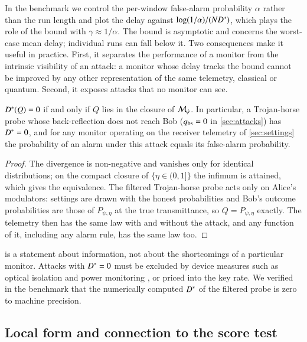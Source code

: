 In the benchmark we control the per-window false-alarm probability $\alpha$ rather than the run length and plot the delay against $\log(1/\alpha)/(ND^{\ast})$, which plays the role of the bound with $\gamma\approx1/\alpha$. The bound is asymptotic and concerns the worst-case mean delay; individual runs can fall below it. Two consequences make it useful in practice. First, it separates the performance of a monitor from the intrinsic visibility of an attack: a monitor whose delay tracks the bound cannot be improved by any other representation of the same telemetry, classical or quantum. Second, it exposes attacks that no monitor can see.

\begin{proposition}\label{prop:blind}
$D^{\ast}(Q)=0$ if and only if $Q$ lies in the closure of $\mathcal{M}_\psi$. In particular, a Trojan-horse probe whose back-reflection does not reach Bob ($q_{\rm bs}=0$ in \cref{sec:attacks}) has $D^{\ast}=0$, and for any monitor operating on the receiver telemetry of \cref{sec:settings} the probability of an alarm under this attack equals its false-alarm probability.
\end{proposition}
\begin{proof}
The divergence is non-negative and vanishes only for identical distributions; on the compact closure of $\{\eta\in(0,1]\}$ the infimum is attained, which gives the equivalence. The filtered Trojan-horse probe acts only on Alice's modulators: settings are drawn with the honest probabilities and Bob's outcome probabilities are those of $P_{\psi,\eta}$ at the true transmittance, so $Q=P_{\psi,\eta}$ exactly. The telemetry then has the same law with and without the attack, and any function of it, including any alarm rule, has the same law too.
\end{proof}

 is a statement about information, not about the shortcomings of a particular monitor. Attacks with $D^{\ast}=0$ must be excluded by device measures such as optical isolation and power monitoring \cite{Lucamarini2015,Ponosova2022}, or priced into the key rate. We verified in the benchmark that the numerically computed $D^{\ast}$ of the filtered probe is zero to machine precision.

\subsection{Local form and connection to the score test}\label{sec:local}

